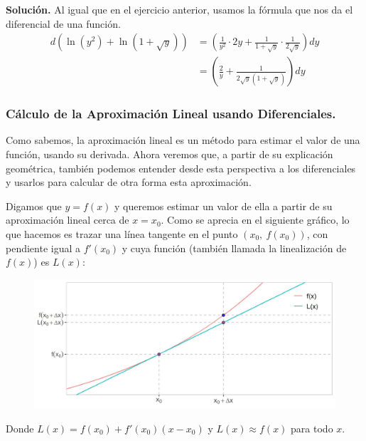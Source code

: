 \documentclass[12pt]{article}
\begin{document}
\textbf{Solución.} \quad Al igual que en el ejercicio anterior, usamos la fórmula que nos da el diferencial de una función.
\begin{align*}
  d(\ln(y^{2}) + \ln(1 + \sqrt{y})) &= \left(
                                          \frac{1}{y^{2}} \cdot 2y +
                                          \frac{1}{1+\sqrt{y}} \cdot \frac{1}{2\sqrt{y}}
                                        \right) dy \\
                                    &= \left(\frac{2}{y} + \frac{1}{2\sqrt{y}(1 + \sqrt{y})}\right) dy
\end{align*}

\subsubsection{Cálculo de la Aproximación Lineal usando Diferenciales.}

Como sabemos, la aproximación lineal es un método para estimar el valor de una función, usando su derivada. Ahora veremos que, a partir de su explicación geométrica, también podemos entender desde esta perspectiva a los diferenciales y usarlos para calcular de otra forma esta aproximación.

Digamos que $y = f(x)$ y queremos estimar un valor de ella a partir de su aproximación lineal cerca de $x = x_{0}$. Como se aprecia en el siguiente gráfico, lo que hacemos es trazar una línea tangente en el punto $(x_{0}, \ f(x_{0}))$, con pendiente igual a $f'(x_{0})$ y cuya función (también llamada la linealización de $f(x)$) es $L(x)$:

\begin{figure}[hbt!]
\centering
\includegraphics[scale=0.7]{img/diff_examp_plot.jpg}
\end{figure}

Donde $L(x) = f(x_{0}) + f'(x_{0})(x - x_{0})$ y $L(x) \approx f(x)$ para todo $x$.
\end{document}
